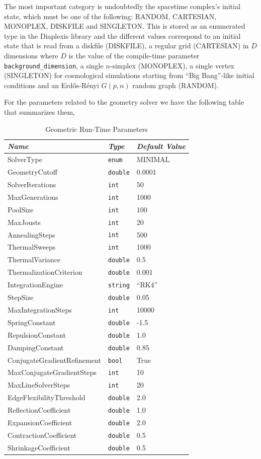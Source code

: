 \documentclass[12pt,letterpaper]{report}
\begin{document}
The most important category is undoubtedly the spacetime complex's initial state, 
which must be one of the following: RANDOM, CARTESIAN, MONOPLEX, DISKFILE and 
SINGLETON. This is stored as an enumerated type in the Diaplexis library and the 
different values correspond to an initial state that is read from a diskfile (DISKFILE), 
a regular grid (CARTESIAN) in $D$ dimensions where $D$ is the value of the compile-time 
parameter \texttt{background\_dimension}, a single $n$-simplex (MONOPLEX), a single vertex 
(SINGLETON) for cosmological simulations starting from ``Big Bang''-like initial conditions 
and an Erd\H{o}s-R\'enyi $G(p,n)$ random graph (RANDOM). 

For the parameters related to the geometry solver we have the following table that 
summarizes them,
\begin{table}[htbp]
\centering
\begin{tabular}{|l|l|l|}
\hline
\emph{Name} & \emph{Type} & \emph{Default Value} \\ 
\hline \hline
SolverType & \texttt{enum} & MINIMAL \\
GeometryCutoff & \texttt{double} & 0.0001 \\
SolverIterations & \texttt{int} & 50 \\
MaxGenerations & \texttt{int} & 1000 \\
PoolSize & \texttt{int} & 100 \\ 
MaxJousts & \texttt{int} & 20 \\ 
AnnealingSteps & \texttt{int} & 500 \\ 
ThermalSweeps & \texttt{int} & 1000 \\
ThermalVariance & \texttt{double} & 0.5 \\
ThermalizationCriterion & \texttt{double} & 0.001 \\
IntegrationEngine & \texttt{string} & ``RK4'' \\
StepSize & \texttt{double} & 0.05 \\
MaxIntegrationSteps & \texttt{int} & 10000 \\
SpringConstant & \texttt{double} & -1.5 \\
RepulsionConstant & \texttt{double} & 1.0 \\
DampingConstant & \texttt{double} & 0.85 \\
ConjugateGradientRefinement & \texttt{bool} & True \\
MaxConjugateGradientSteps & \texttt{int} & 10 \\
MaxLineSolverSteps & \texttt{int} & 20 \\
EdgeFlexibilityThreshold & \texttt{double} & 2.0 \\
ReflectionCoefficient & \texttt{double} & 1.0 \\
ExpansionCoefficient & \texttt{double} & 2.0 \\
ContractionCoefficient & \texttt{double} & 0.5 \\
ShrinkageCoefficient & \texttt{double} & 0.5 \\
\hline
\end{tabular}
\caption{Geometric Run-Time Parameters}
\label{rt_parms2}
\end{table}
\end{document}

